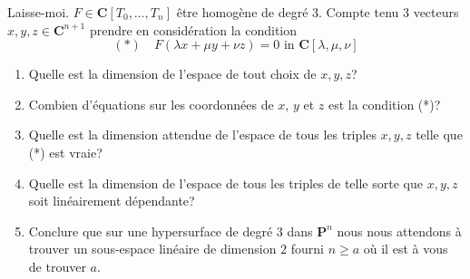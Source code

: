 \begin{exercise}
\label{exercise-cubics}
Laisse-moi. $F \in \mathbf{C}[T_0, \ldots, T_n]$ être homogène de degré $3$. Compte tenu
$3$ vecteurs $x, y, z \in \mathbf{C}^{n + 1}$ prendre en considération la condition
$$
(*)\quad
F(\lambda x + \mu y + \nu z) = 0 \text{ in } \mathbf{C}[\lambda, \mu, \nu]
$$
\begin{enumerate}
\item Quelle est la dimension de l'espace de tout choix de $x, y, z$?
\item Combien d'équations sur les coordonnées de $x$, $y$ et $z$ est
la condition (*)?
\item Quelle est la dimension attendue de l'espace de tous les triples $x,
y, z$ telle que (*) est vraie?
\item Quelle est la dimension de l'espace de tous les triples de telle sorte
que $x, y, z$ soit linéairement dépendante?
\item Conclure que sur une hypersurface de degré $3$ dans $\mathbf{P}^n$ nous nous
attendons à trouver un sous-espace linéaire de dimension $2$ fourni $n \geq
a$ où il est à vous de trouver $a$.
\end{enumerate}
\end{exercise}


